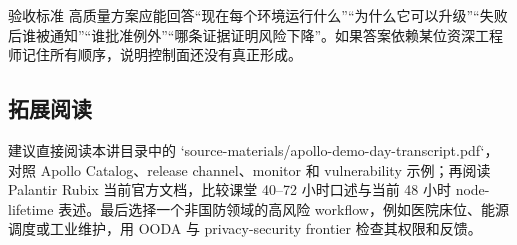 \begin{knowledgebox}{验收标准}
高质量方案应能回答“现在每个环境运行什么”“为什么它可以升级”“失败后谁被通知”“谁批准例外”“哪条证据证明风险下降”。如果答案依赖某位资深工程师记住所有顺序，说明控制面还没有真正形成。
\end{knowledgebox}

\subsection{拓展阅读}

建议直接阅读本讲目录中的 `source-materials/apollo-demo-day-transcript.pdf`，对照 Apollo Catalog、release channel、monitor 和 vulnerability 示例；再阅读 Palantir Rubix 当前官方文档，比较课堂 40--72 小时口述与当前 48 小时 node-lifetime 表述。最后选择一个非国防领域的高风险 workflow，例如医院床位、能源调度或工业维护，用 OODA 与 privacy-security frontier 检查其权限和反馈。


